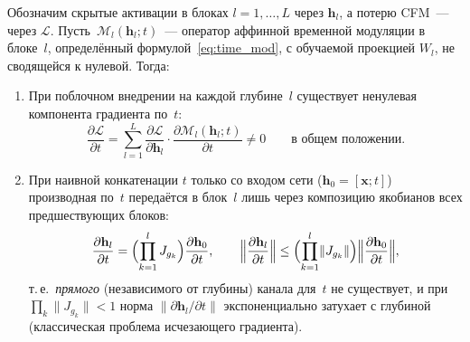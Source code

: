 \begin{proposition}
\label{prop:time_signal}
Обозначим скрытые активации в блоках $l=1,\ldots,L$ через $\mathbf{h}_l$, а потерю CFM~--- через $\mathcal{L}$. Пусть~$\mathcal{M}_l(\mathbf{h}_l;t)$~--- оператор аффинной временной модуляции в блоке~$l$, определённый формулой~\eqref{eq:time_mod}, с обучаемой проекцией $W_l$, не сводящейся к нулевой. Тогда:
\begin{enumerate}
    \item[\rm (i)] При поблочном внедрении на каждой глубине~$l$ существует ненулевая компонента градиента по~$t$:
    \begin{equation}
        \frac{\partial \mathcal{L}}{\partial t}
        = \sum_{l=1}^{L} \frac{\partial \mathcal{L}}{\partial \mathbf{h}_l} \cdot \frac{\partial \mathcal{M}_l(\mathbf{h}_l; t)}{\partial t} \neq 0
        \qquad \text{в общем положении.}
        \label{eq:dLdt_perblock}
    \end{equation}
    \item[\rm (ii)] При наивной конкатенации $t$ только со входом сети ($\mathbf{h}_0=[\mathbf{x};t]$) производная по~$t$ передаётся в блок~$l$ лишь через композицию якобианов всех предшествующих блоков:
    \begin{equation}
        \frac{\partial \mathbf{h}_l}{\partial t} = \Bigl(\prod_{k=1}^{l} J_{g_k}\Bigr)\frac{\partial \mathbf{h}_0}{\partial t}, \qquad
        \Bigl\lVert\frac{\partial \mathbf{h}_l}{\partial t}\Bigr\rVert \le \Bigl(\prod_{k=1}^{l}\lVert J_{g_k}\rVert\Bigr)\Bigl\lVert\frac{\partial \mathbf{h}_0}{\partial t}\Bigr\rVert,
        \label{eq:dh_concat}
    \end{equation}
    т.\,е.\ \emph{прямого} (независимого от глубины) канала для~$t$ не существует, и при $\prod_{k}\lVert J_{g_k}\rVert<1$ норма $\lVert\partial\mathbf{h}_l/\partial t\rVert$ экспоненциально затухает с глубиной (классическая проблема исчезающего градиента).
\end{enumerate}
\end{proposition}

